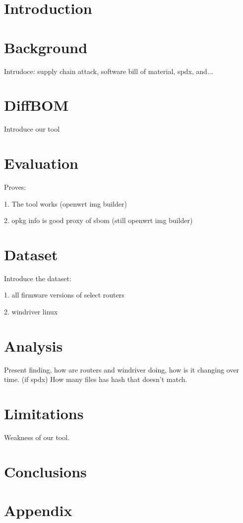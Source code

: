 \section{Introduction}

\section{Background}

Intrudoce: supply chain attack, software bill of material, spdx, and...

\section{DiffBOM}

Introduce our tool

\section{Evaluation}

Proves:\par
1. The tool works (openwrt img builder)\par
2. opkg info is good proxy of sbom (still openwrt img builder)

\section{Dataset}

Introduce the dataset:\par
1. all firmware versions of select routers\par
2. windriver linux\par

\section{Analysis}

Present finding, how are routers and windriver doing, how is it changing over time. (if spdx) How many files has hash that doesn't match.

\section{Limitations}

Weakness of our tool.

\section{Conclusions}

\appendix

\section{Appendix}

\begin{acks}
\end{acks}
